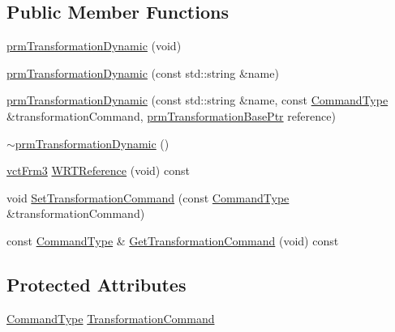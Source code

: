 \subsection*{Public Member Functions}
\begin{DoxyCompactItemize}
\item 
\hyperlink{classprm_transformation_dynamic_aefde621ffa116e694842a9eccfadc227}{prm\+Transformation\+Dynamic} (void)
\item 
\hyperlink{classprm_transformation_dynamic_a40477c627d81e17067d27ec4aeb9fffe}{prm\+Transformation\+Dynamic} (const std\+::string \&name)
\item 
\hyperlink{classprm_transformation_dynamic_a1b887213a2c3679c53155c848a920b6c}{prm\+Transformation\+Dynamic} (const std\+::string \&name, const \hyperlink{classprm_transformation_dynamic_a08d4a3817f09c309060cbd5a70c6cfb9}{Command\+Type} \&transformation\+Command, \hyperlink{prm_transformation_base_8h_a881a6a7d2191474974cdf36d79e1df08}{prm\+Transformation\+Base\+Ptr} reference)
\item 
\hyperlink{classprm_transformation_dynamic_a373b9f14737587687dd3df69818b4816}{$\sim$prm\+Transformation\+Dynamic} ()
\item 
\hyperlink{vct_transformation_types_8h_a81feda0a02c2d1bc26e5553f409fed20}{vct\+Frm3} \hyperlink{classprm_transformation_dynamic_ac2faf487f580a9d5c757bb61243b4e7c}{W\+R\+T\+Reference} (void) const 
\end{DoxyCompactItemize}
{\bf }\par
\begin{DoxyCompactItemize}
\item 
void \hyperlink{classprm_transformation_dynamic_a31d600dddb3cb2f83bfd0579e376dc75}{Set\+Transformation\+Command} (const \hyperlink{classprm_transformation_dynamic_a08d4a3817f09c309060cbd5a70c6cfb9}{Command\+Type} \&transformation\+Command)
\item 
const \hyperlink{classprm_transformation_dynamic_a08d4a3817f09c309060cbd5a70c6cfb9}{Command\+Type} \& \hyperlink{classprm_transformation_dynamic_a0a6054a2011d559cf6b1fc5b8260a712}{Get\+Transformation\+Command} (void) const 
\end{DoxyCompactItemize}

\subsection*{Protected Attributes}
\begin{DoxyCompactItemize}
\item 
\hyperlink{classprm_transformation_dynamic_a08d4a3817f09c309060cbd5a70c6cfb9}{Command\+Type} \hyperlink{classprm_transformation_dynamic_a09131f273e7dd6388d357b6830ff5069}{Transformation\+Command}
\end{DoxyCompactItemize}
